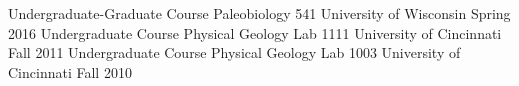 \begin{cventries}
  \cventry
    {Undergraduate-Graduate Course}
    {Paleobiology 541}
    {University of Wisconsin}
    {Spring 2016}
    {}
  \cventry
    {Undergraduate Course}
    {Physical Geology Lab 1111}
    {University of Cincinnati}
    {Fall 2011}
    {}
  \cventry
    {Undergraduate Course}
    {Physical Geology Lab 1003}
    {University of Cincinnati}
    {Fall 2010}
    {}
\end{cventries}
